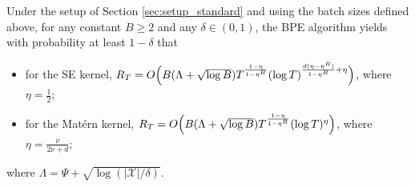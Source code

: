\documentclass[10pt]{article}
\begin{document}
\begin{lemma}
    \emph{\citep[Theorem 2]{Li22}}
    \label{lem:upper_static_grid_li}
    Under the setup of Section \ref{sec:setup_standard} and using the batch sizes defined above,
    for any constant $B\geq 2$ and any $\delta \in (0,1)$,
    the BPE algorithm yields with probability at least $1-\delta$ that
    \begin{itemize}
        \item for the SE kernel,
        $R_T = O \Bigl( B(\Lambda+\sqrt{\log B}) T^{\frac{1-\eta}{1-\eta^B}} (\log T)^{\frac{d(\eta-\eta^B)}{1-\eta^B}+\eta}\Bigr)$, where $\eta=\frac{1}{2}$;
        \item for the Mat\'ern kernel, $R_T = O \Bigl(B (\Lambda+\sqrt{\log B}) T^{\frac{1-\eta}{1-\eta^B}} (\log T)^{\eta}\Bigr)$, where $\eta = \frac{\nu}{2\nu+d}$;
    \end{itemize}
    where $\Lambda=\Psi+\sqrt{\log(|\mathcal{X}|/\delta)}$.
\end{lemma}
\end{document}
